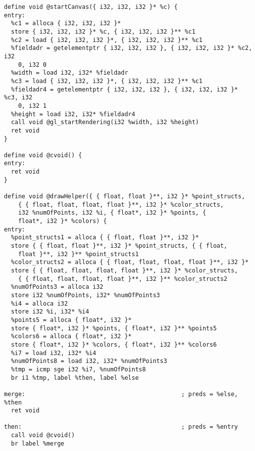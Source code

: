 \documentclass[main.tex]{subfiles}
\begin{document}
{\begin{lstlisting}
define void @startCanvas({ i32, i32, i32 }* %c) {
entry:
  %c1 = alloca { i32, i32, i32 }*
  store { i32, i32, i32 }* %c, { i32, i32, i32 }** %c1
  %c2 = load { i32, i32, i32 }*, { i32, i32, i32 }** %c1
  %fieldadr = getelementptr { i32, i32, i32 }, { i32, i32, i32 }* %c2, i32
    0, i32 0
  %width = load i32, i32* %fieldadr
  %c3 = load { i32, i32, i32 }*, { i32, i32, i32 }** %c1
  %fieldadr4 = getelementptr { i32, i32, i32 }, { i32, i32, i32 }* %c3, i32
    0, i32 1
  %height = load i32, i32* %fieldadr4
  call void @gl_startRendering(i32 %width, i32 %height)
  ret void
}

define void @cvoid() {
entry:
  ret void
}

define void @drawHelper({ { float, float }**, i32 }* %point_structs,
    { { float, float, float, float }**, i32 }* %color_structs, 
    i32 %numOfPoints, i32 %i, { float*, i32 }* %points, { 
    float*, i32 }* %colors) {
entry:
  %point_structs1 = alloca { { float, float }**, i32 }*
  store { { float, float }**, i32 }* %point_structs, { { float, 
    float }**, i32 }** %point_structs1
  %color_structs2 = alloca { { float, float, float, float }**, i32 }*
  store { { float, float, float, float }**, i32 }* %color_structs, 
    { { float, float, float, float }**, i32 }** %color_structs2
  %numOfPoints3 = alloca i32
  store i32 %numOfPoints, i32* %numOfPoints3
  %i4 = alloca i32
  store i32 %i, i32* %i4
  %points5 = alloca { float*, i32 }*
  store { float*, i32 }* %points, { float*, i32 }** %points5
  %colors6 = alloca { float*, i32 }*
  store { float*, i32 }* %colors, { float*, i32 }** %colors6
  %i7 = load i32, i32* %i4
  %numOfPoints8 = load i32, i32* %numOfPoints3
  %tmp = icmp sge i32 %i7, %numOfPoints8
  br i1 %tmp, label %then, label %else

merge:                                            ; preds = %else, %then
  ret void

then:                                             ; preds = %entry
  call void @cvoid()
  br label %merge


\end{lstlisting}}
\end{document}

